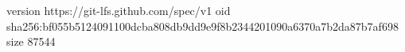 version https://git-lfs.github.com/spec/v1
oid sha256:bf055b5124091100dcba808db9dd9e9f8b2344201090a6370a7b2da87b7af698
size 87544
